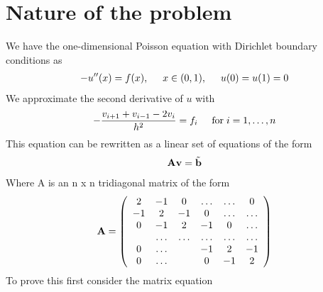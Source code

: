 \section{Nature of the problem}
\label{sec:NatureOfTheProblem}
We have the one-dimensional Poisson equation with Dirichlet boundary conditions as
\begin{align}
	-u''(x) = f(x), \hspace{0.5cm} x\in(0,1), \hspace{0.5cm} u(0) = u(1) = 0
	\label{eq:Nature1}
\end{align}
We approximate the second derivative of $u$ with
\begin{align}
	-\frac{v_{i+1}+v_{i-1}-2v_i}{h^2} = f_i  \hspace{0.5cm} \mathrm{for} \hspace{0.1cm} i=1,\dots, n
	\label{eq:Nature2}
\end{align}
This equation can be rewritten as a linear set of equations of the form
\begin{align}
	\mbox{\textbf{A}}\mbox{\textbf{v}} = \tilde{\mbox{\textbf{b}}}
	\label{eq:Nature3}
\end{align}
Where A is an n x n tridiagonal matrix of the form
\begin{align}
	\mbox{\textbf{A}} = \left(\begin{array}{cccccc}
                           2& -1& 0 &\dots   & \dots &0 \\
                           -1 & 2 & -1 &0 &\dots &\dots \\
                           0&-1 &2 & -1 & 0 & \dots \\
                           & \dots   & \dots &\dots   &\dots & 									\dots \\
                           0&\dots   &  &-1 &2& -1 \\
                           0&\dots    &  & 0  &-1 & 2 \\
                      \end{array} \right)
	\label{eq:Nature4}
\end{align}
To prove this first consider the matrix equation

